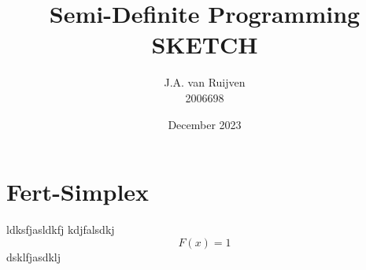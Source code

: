 \documentclass{article}
\title{Semi-Definite Programming SKETCH}
\author{J.A. van Ruijven \\ 2006698 }
\date{December 2023}
\begin{document}
\maketitle
\section{Fert-Simplex}
ldksfjasldkfj
kdjfalsdkj
\begin{equation}
	F(x) = 1
	\label{eq:Fert-Simplex minimization}
\end{equation}
\newpage
dsklfjasdklj
\end{document}
